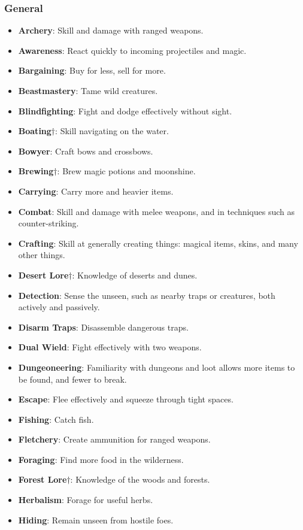 \subsubsection{General}
\begin{itemize}
\item {\bf Archery}: Skill and damage with ranged weapons.
\item {\bf Awareness}: React quickly to incoming projectiles and magic.
\item {\bf Bargaining}: Buy for less, sell for more.
\item {\bf Beastmastery}: Tame wild creatures.
\item {\bf Blindfighting}: Fight and dodge effectively without sight. 
\item {\bf Boating}$\dagger$: Skill navigating on the water.
\item {\bf Bowyer}: Craft bows and crossbows.
\item {\bf Brewing}$\dagger$: Brew magic potions and moonshine. 
\item {\bf Carrying}: Carry more and heavier items.
\item {\bf Combat}: Skill and damage with melee weapons, and in techniques such as counter-striking.
\item {\bf Crafting}: Skill at generally creating things: magical items, skins, and many other things.
\item {\bf Desert Lore}$\dagger$: Knowledge of deserts and dunes. 
\item {\bf Detection}: Sense the unseen, such as nearby traps or creatures, both actively and passively.
\item {\bf Disarm Traps}: Disassemble dangerous traps. 
\item {\bf Dual Wield}: Fight effectively with two weapons. 
\item {\bf Dungeoneering}: Familiarity with dungeons and loot allows more items to be found, and fewer to break.
\item {\bf Escape}: Flee effectively and squeeze through tight spaces.
\item {\bf Fishing}: Catch fish.
\item {\bf Fletchery}: Create ammunition for ranged weapons.
\item {\bf Foraging}: Find more food in the wilderness.
\item {\bf Forest Lore}$\dagger$: Knowledge of the woods and forests. 
\item {\bf Herbalism}: Forage for useful herbs. 
\item {\bf Hiding}: Remain unseen from hostile foes.

\end{itemize}
